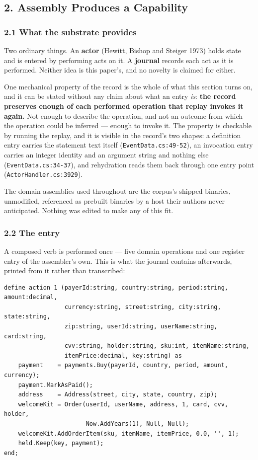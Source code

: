 \documentclass[
]{article}
\begin{document}
\subsection{2. Assembly Produces a
Capability}\label{assembly-produces-a-capability}

\subsubsection{2.1 What the substrate
provides}\label{what-the-substrate-provides}

Two ordinary things. An \textbf{actor} (Hewitt, Bishop and Steiger 1973)
holds state and is entered by performing acts on it. A \textbf{journal}
records each act as it is performed. Neither idea is this paper's, and
no novelty is claimed for either.

One mechanical property of the record is the whole of what this section
turns on, and it can be stated without any claim about what an entry
\emph{is}: \textbf{the record preserves enough of each performed
operation that replay invokes it again.} Not enough to describe the
operation, and not an outcome from which the operation could be inferred
--- enough to invoke it. The property is checkable by running the
replay, and it is visible in the record's two shapes: a definition entry
carries the statement text itself (\texttt{EventData.cs:49-52}), an
invocation entry carries an integer identity and an argument string and
nothing else (\texttt{EventData.cs:34-37}), and rehydration reads them
back through one entry point (\texttt{ActorHandler.cs:3929}).

The domain assemblies used throughout are the corpus's shipped binaries,
unmodified, referenced as prebuilt binaries by a host their authors
never anticipated. Nothing was edited to make any of this fit.

\subsubsection{2.2 The entry}\label{the-entry}

A composed verb is performed once --- five domain operations and one
register entry of the assembler's own. This is what the journal contains
afterwards, printed from it rather than transcribed:

\begin{verbatim}
define action 1 (payerId:string, country:string, period:string, amount:decimal,
                 currency:string, street:string, city:string, state:string,
                 zip:string, userId:string, userName:string, card:string,
                 cvv:string, holder:string, sku:int, itemName:string,
                 itemPrice:decimal, key:string) as
    payment    = payments.Buy(payerId, country, period, amount, currency);
    payment.MarkAsPaid();
    address    = Address(street, city, state, country, zip);
    welcomeKit = Order(userId, userName, address, 1, card, cvv, holder,
                       Now.AddYears(1), Null, Null);
    welcomeKit.AddOrderItem(sku, itemName, itemPrice, 0.0, '', 1);
    held.Keep(key, payment);
end;
\end{verbatim}
\end{document}
